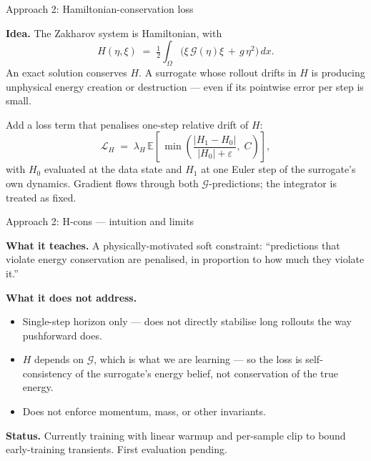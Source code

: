 \documentclass[aspectratio=169,11pt]{beamer}
\newcommand{\Gop}{\mathcal{G}}
\begin{document}
\begin{frame}{Approach 2: Hamiltonian-conservation loss}

\textbf{Idea.} The Zakharov system is Hamiltonian, with
\[
  H(\eta,\xi) \;=\; \tfrac12\!\int_\Omega
    \bigl(\xi\,\Gop(\eta)\xi \,+\, g\,\eta^2\bigr)\,dx.
\]
An exact solution conserves $H$. A surrogate whose rollout drifts in
$H$ is producing unphysical energy creation or destruction --- even
if its pointwise error per step is small.

\medskip

Add a loss term that penalises one-step relative drift of $H$:
\[
  \mathcal{L}_H \;=\; \lambda_H\,
    \mathbb{E}\!\left[\,\min\!\left(
      \frac{|H_1 - H_0|}{|H_0| + \varepsilon},\;C
    \right)\right],
\]
with $H_0$ evaluated at the data state and $H_1$ at one Euler step of
the surrogate's own dynamics. Gradient flows through both
$\Gop$-predictions; the integrator is treated as fixed.
\end{frame}

\begin{frame}{Approach 2: H-cons --- intuition and limits}

\textbf{What it teaches.} A physically-motivated soft constraint:
``predictions that violate energy conservation are penalised, in
proportion to how much they violate it.''

\medskip

\textbf{What it does not address.}
\begin{itemize}
  \item Single-step horizon only --- does not directly stabilise
        long rollouts the way pushforward does.
  \item $H$ depends on $\Gop$, which is what we are learning ---
        so the loss is self-consistency of the surrogate's energy
        belief, not conservation of the true energy.
  \item Does not enforce momentum, mass, or other invariants.
\end{itemize}

\pause
\medskip

\textbf{Status.} Currently training with linear warmup and per-sample
clip to bound early-training transients. First evaluation pending.
\end{frame}
\end{document}
